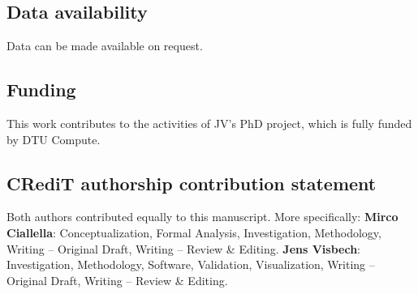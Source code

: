 \documentclass{article}
\begin{document}
\subsection*{Data availability}
Data can be made available on request.

\subsection*{Funding}
This work contributes to the activities of JV's PhD project, which is fully funded by DTU Compute.

\subsection*{CRediT authorship contribution statement}
Both authors contributed equally to this manuscript. More specifically: \textbf{Mirco Ciallella}: Conceptualization, Formal Analysis, Investigation, Methodology, Writing – Original Draft, Writing – Review \& Editing. \textbf{Jens Visbech}: Investigation, Methodology, Software, Validation, Visualization, Writing – Original Draft, Writing – Review \& Editing. 


  

% 
\end{document}
